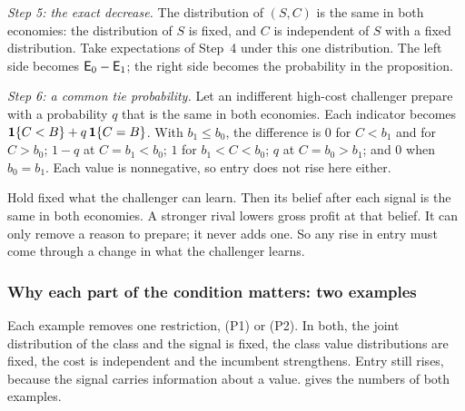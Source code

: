 \emph{Step 5: the exact decrease.} The distribution of \((S,C)\) is the same in both economies: the distribution of \(S\) is fixed, and
\(C\) is independent of \(S\) with a fixed distribution. Take expectations of Step~4 under this one distribution. The left side becomes
\(\mathsf{E}_0-\mathsf{E}_1\); the right side becomes the probability in the proposition.

\emph{Step 6: a common tie probability.} Let an indifferent high-cost challenger prepare with a probability \(q\) that
is the same in both economies. Each indicator becomes \(\mathbf{1}\{C<B\}+q\,\mathbf{1}\{C=B\}\). With \(b_1\le b_0\), the difference
is \(0\) for \(C<b_1\) and for \(C>b_0\); \(1-q\) at \(C=b_1<b_0\); \(1\) for \(b_1<C<b_0\); \(q\) at \(C=b_0>b_1\); and
\(0\) when \(b_0=b_1\). Each value is nonnegative, so entry does not rise here either.

\begin{intuition}
Hold fixed what the challenger can learn. Then its belief after each signal is the same in both economies. A stronger
rival lowers gross profit at that belief. It can only remove a reason to prepare; it never adds one. So any rise in
entry must come through a change in what the challenger learns.
\end{intuition}

\subsubsection*{Why each part of the condition matters: two examples}

Each example removes one restriction, (P1) or (P2). In both, the joint distribution of the class and the
signal is fixed, the class value distributions are fixed, the cost is independent and the incumbent strengthens. Entry still
rises, because the signal carries information about a value.  gives the numbers of
both examples.

